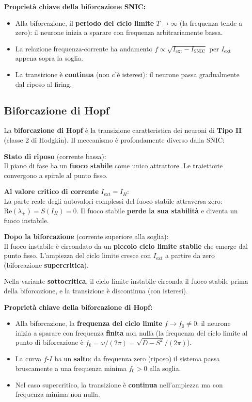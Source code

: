 \textbf{Proprietà chiave della biforcazione SNIC:}
\begin{itemize}
    \item Alla biforcazione, il \textbf{periodo del ciclo limite} $T \to \infty$ (la frequenza tende a zero): il neurone inizia a sparare con frequenza arbitrariamente bassa.
    \item La relazione frequenza-corrente ha andamento $f \propto \sqrt{I_{\text{ext}} - I_{\text{SNIC}}}$ per $I_{\text{ext}}$ appena sopra la soglia.
    \item La transizione è \textbf{continua} (non c'è isteresi): il neurone passa gradualmente dal riposo al firing.
\end{itemize}


\subsection{Biforcazione di Hopf }

La \textbf{biforcazione di Hopf} è la transizione caratteristica dei neuroni di \textbf{Tipo II} (classe 2 di Hodgkin). Il meccanismo è profondamente diverso dalla SNIC:

\textbf{Stato di riposo} (corrente bassa):\\
Il piano di fase ha un \textbf{fuoco stabile} come unico attrattore. Le traiettorie convergono a spirale al punto fisso.

\textbf{Al valore critico di corrente} $I_{\text{ext}} = I_H$:\\
La parte reale degli autovalori complessi del fuoco stabile attraversa zero: $\text{Re}(\lambda_\pm) = S(I_H) = 0$. Il fuoco stabile \textbf{perde la sua stabilità} e diventa un fuoco instabile.

\textbf{Dopo la biforcazione} (corrente superiore alla soglia):\\
Il fuoco instabile è circondato da un \textbf{piccolo ciclo limite stabile} che emerge dal punto fisso. L'ampiezza del ciclo limite cresce con $I_{\text{ext}}$ a partire da zero (biforcazione \textbf{supercritica}).

Nella variante \textbf{sottocritica}, il ciclo limite instabile circonda il fuoco stabile prima della biforcazione, e la transizione è discontinua (con isteresi).

\textbf{Proprietà chiave della biforcazione di Hopf:}
\begin{itemize}
    \item Alla biforcazione, la \textbf{frequenza del ciclo limite} $f \to f_0 \neq 0$: il neurone inizia a sparare con frequenza \textbf{finita} non nulla (la frequenza del ciclo limite al punto di biforcazione è $f_0 = \omega/(2\pi) = \sqrt{D - S^2}/(2\pi)$).
    \item La curva $f$-$I$ ha un \textbf{salto}: da frequenza zero (riposo) il sistema passa bruscamente a una frequenza minima $f_0 > 0$ alla soglia.
    \item Nel caso supercritico, la transizione è \textbf{continua} nell'ampiezza ma con frequenza minima non nulla.
\end{itemize}




